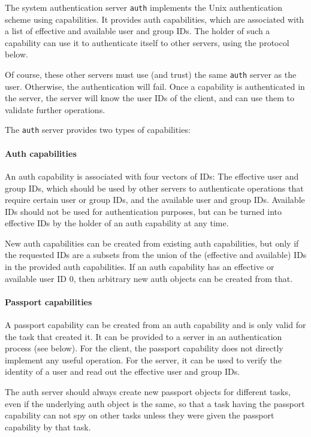 \documentclass[9pt,a4paper]{extarticle}
\begin{document}
The system authentication server \texttt{auth} implements the Unix
authentication scheme using capabilities.  It provides auth
capabilities, which are associated with a list of effective and
available user and group IDs.  The holder of such a capability can use
it to authenticate itself to other servers, using the protocol below.

Of course, these other servers must use (and trust) the same
\texttt{auth} server as the user.  Otherwise, the authentication will
fail.  Once a capability is authenticated in the server, the server
will know the user IDs of the client, and can use them to validate
further operations.

The \texttt{auth} server provides two types of capabilities:

\paragraph{Auth capabilities}
An auth capability is associated with four vectors of IDs: The
effective user and group IDs, which should be used by other servers to
authenticate operations that require certain user or group IDs, and
the available user and group IDs.  Available IDs should not be used
for authentication purposes, but can be turned into effective IDs by
the holder of an auth capability at any time.

New auth capabilities can be created from existing auth capabilities,
but only if the requested IDs are a subsets from the union of the
(effective and available) IDs in the provided auth capabilities.  If
an auth capability has an effective or available user ID 0, then
arbitrary new auth objects can be created from that.

\paragraph{Passport capabilities}
A passport capability can be created from an auth capability and is
only valid for the task that created it.  It can be provided to a
server in an authentication process (see below).  For the client, the
passport capability does not directly implement any useful operation.
For the server, it can be used to verify the identity of a user and
read out the effective user and group IDs.

The auth server should always create new passport objects for
different tasks, even if the underlying auth object is the same, so
that a task having the passport capability can not spy on other tasks
unless they were given the passport capability by that task.
\end{document}

